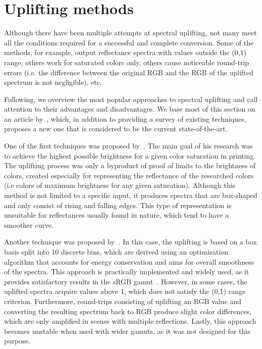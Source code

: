 \section{Uplifting methods} \label{sec:upliftingMethods}

Although there have been multiple attempts at spectral uplifting, not many meet all the conditions required for a successful and complete conversion. Some of the methods, for example, output reflectance spectra with values outside the (0,1) range, others work for saturated colors only, others cause noticeable round-trip errors (i.e. the difference between the original RGB and the RGB of the uplifted spectrum is not negligible), etc.

Following, we overview the most popular approaches to spectral uplifting and call attention to their advantages and disadvantages. We base most of this section on an article by~\citet{upsamplingTechniques}, which, in addition to providing a survey of existing techniques, proposes a new one that is considered to be the current state-of-the-art.

One of the first techniques was proposed by~\citet{upsamplingMacAdam}. The main goal of his research was to achieve the highest possible brightness for a given color saturation in printing. The uplifting process was only a byproduct of proof of limits to the brightness of colors, created especially for representing the reflectance of the researched colors (i.e colors of maximum brightness for any given saturation). Although this method is not limited to a specific input, it produces spectra that are box-shaped and only consist of rising and falling edges. This type of representation is unsuitable for reflectances usually found in nature, which tend to have a smoother curve.

Another technique was proposed by~\citet{upsamplingSmits}. In this case, the uplifting is based on a box basis split into 10 discrete bins, which are derived using an optimization algorithm that accounts for energy conservation and aims for overall smoothness of the spectra. This approach is practically implemented and widely used, as it provides satisfactory results in the sRGB gamut~\cite{upsamplingJakobHanika}. However, in some cases, the uplifted spectra acquire values above 1, which does not satisfy the (0,1) range criterion. Furthermore, round-trips consisting of uplifting an RGB value and converting the resulting spectrum back to RGB produce slight color differences, which are only amplified in scenes with multiple reflections. Lastly, this approach becomes unstable when used with wider gamuts, as it was not designed for this purpose.

